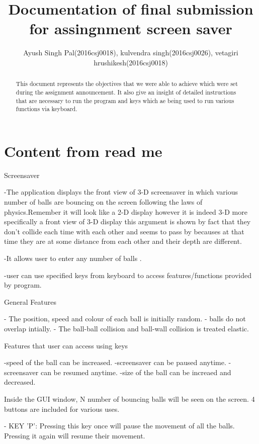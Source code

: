 \documentclass[]{article}
\begin{document}
\title{Documentation of final submission for assingnment screen saver}
\author{Ayush Singh Pal(2016csj0018),
kulvendra singh(2016csj0026),
vetagiri hrushikesh(2016csj0018)}
\maketitle

\begin{abstract}
This document represents the objectives that we were able to achieve which were set during the assignment announcement.
It also give an insight of detailed instructions that are necessary to run the program and keys which ae being used to run various functions via keyboard.
\end{abstract}
\section{Content from read me}
 Screensaver
 
-The application displays the front view of 3-D screensaver in which various number of balls are bouncing on the screen following the laws of physics.Remember it will look like a 2-D display however it is indeed 3-D more specifically a front view of 3-D display this argument is shown by fact that they don't collide each time with each other and seems to pass by becauses at that time they are at some distance from each other and their depth are different.

-It allows user to enter any number of balls .

-user can use specified keys from keyboard to access features/functions  provided by program.

General Features

- The position, speed and colour of each ball is initially random. 
- balls do not overlap intially. 
- The ball-ball collision and ball-wall collision is treated elastic.

Features that  user can access using keys

-speed of the ball can be increased.
-screensaver can be paused anytime.
-screensaver can be resumed anytime.
-size of the ball can be increaed and decreased.

Inside the GUI window, N number of bouncing balls will be seen on the screen. 4 buttons are included for various uses.

-	 KEY 'P': Pressing this key once will pause the movement of all the balls. Pressing it again will resume their movement.
\end{document}
